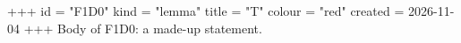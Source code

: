 +++
id = "F1D0"
kind = "lemma"
title = "T"
colour = "red"
created = 2026-11-04
+++
Body of F1D0: a made-up statement.
